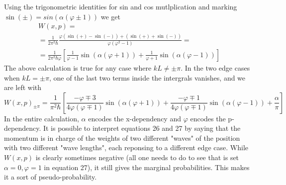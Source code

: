 \documentclass{article}
\begin{document}
Using the trigonometric identities for sin and cos mutlplication and marking $\sin(\pm) = sin(\alpha\left(\varphi\pm1\right))$ we get
\begin{equation}
\begin{gathered}
    W(x, p) = \\
    = \frac{1}{2\pi^2 \hbar}
    \frac{\varphi (\sin(+) - \sin(-)) + (\sin(+) + \sin(-))}{\varphi(\varphi^2 - 1)} = \\
    = \frac{1}{2\pi^2 \hbar \varphi}
    \left[
    \frac{1}{\varphi - 1}\sin(\alpha(\varphi + 1)) +
    \frac{1}{\varphi + 1}\sin(\alpha(\varphi - 1))
    \right]
\end{gathered}
\end{equation}
The above calculation is true for any case where $kL \neq \pm\pi$. In the two edge cases when $kL = \pm\pi$, one of the last two terms inside the intergrals vanishes, and we are left with
\begin{equation}
    W(x, p)_{\pm \pi} = \frac{1}{\pi^2\hbar}\left[
    \frac{- \varphi \mp 3}{4\varphi(\varphi\mp1)}\sin(\alpha(\varphi + 1)) +
    \frac{- \varphi \mp 1}{4\varphi(\varphi\mp1)}\sin(\alpha(\varphi - 1)) + \frac{\alpha}{\pi}
    \right]
\end{equation}
In the entire calculation, $\alpha$ encodes the x-dependency and $\varphi$ encodes the p-dependency. It is possible to interpret equations 26 and 27 by saying that the momentum is in charge of the weights of two different "waves" of the position with two different "wave lengths", each reponsing to a different edge case. While $W(x, p)$ is clearly sometimes negative (all one needs to do to see that is set $\alpha = 0, \varphi = 1$ in equation 27), it still gives the marginal probabilities. This makes it a sort of pseudo-probability.
\end{document}
